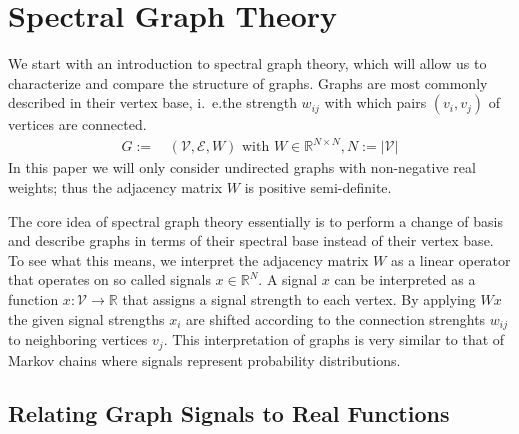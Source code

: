 \section{Spectral Graph Theory}%
\label{sec:sgt}

We start with an introduction to spectral graph theory, which will allow us to characterize and compare the structure of graphs.
Graphs are most commonly described in their vertex base, i.~e.\@ the strength $w_{i j}$ with which pairs $(v_i, v_j)$ of vertices are connected.
\begin{align*}
	G :=&\, (\mathcal{V}, \mathcal{E}, W) \text{ with } W \in \mathbb{R}^{N \times N}, N := |\mathcal{V}|
\end{align*}
In this paper we will only consider undirected graphs with non-negative real weights; thus the adjacency matrix $W$ is positive semi-definite.

The core idea of spectral graph theory essentially is to perform a change of basis and describe graphs in terms of their spectral base instead of their vertex base.
To see what this means, we interpret the adjacency matrix $W$ as a linear operator that operates on so called signals $x \in \mathbb{R}^N$.
A signal $x$ can be interpreted as a function $x: \mathcal{V} \to \mathbb{R}$ that assigns a signal strength to each vertex.
By applying $Wx$ the given signal strengths $x_i$ are shifted according to the connection strenghts $w_{i j}$ to neighboring vertices $v_j$.
This interpretation of graphs is very similar to that of Markov chains where signals represent probability distributions.

\subsection{Relating Graph Signals to Real Functions}%
\label{sec:sgt:real}

